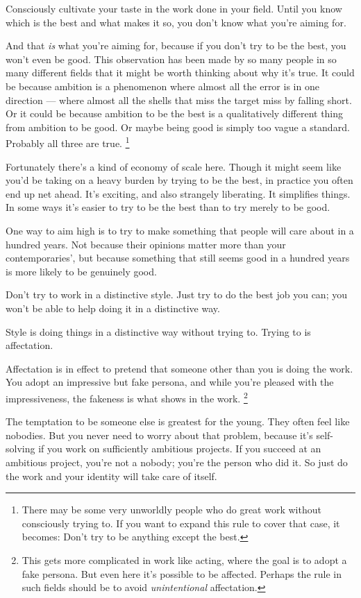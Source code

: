 Consciously cultivate your taste in the work done in your field. Until
you know which is the best and what makes it so, you don't know what
you're aiming for.

And that \emph{is} what you're aiming for, because if you don't try to
be the best, you won't even be good. This observation has been made by
so many people in so many different fields that it might be worth
thinking about why it's true. It could be because ambition is a
phenomenon where almost all the error is in one direction --- where
almost all the shells that miss the target miss by falling short. Or it
could be because ambition to be the best is a qualitatively different
thing from ambition to be good. Or maybe being good is simply too vague
a standard. Probably all three are true. \footnote{There may be some very unworldly people who do great work
without consciously trying to. If you want to expand this rule to cover
that case, it becomes: Don't try to be anything except the best.}

Fortunately there's a kind of economy of scale here. Though it might
seem like you'd be taking on a heavy burden by trying to be the best, in
practice you often end up net ahead. It's exciting, and also strangely
liberating. It simplifies things. In some ways it's easier to try to be
the best than to try merely to be good.

One way to aim high is to try to make something that people will care
about in a hundred years. Not because their opinions matter more than
your contemporaries', but because something that still seems good in a
hundred years is more likely to be genuinely good.

Don't try to work in a distinctive style. Just try to do the best job
you can; you won't be able to help doing it in a distinctive way.

Style is doing things in a distinctive way without trying to. Trying to
is affectation.

Affectation is in effect to pretend that someone other than you is doing
the work. You adopt an impressive but fake persona, and while you're
pleased with the impressiveness, the fakeness is what shows in the work.
\footnote{This gets more complicated in work like acting, where the goal
is to adopt a fake persona. But even here it's possible to be affected.
Perhaps the rule in such fields should be to avoid \emph{unintentional}
affectation.}

The temptation to be someone else is greatest for the young. They often
feel like nobodies. But you never need to worry about that problem,
because it's self-solving if you work on sufficiently ambitious
projects. If you succeed at an ambitious project, you're not a nobody;
you're the person who did it. So just do the work and your identity will
take care of itself.

